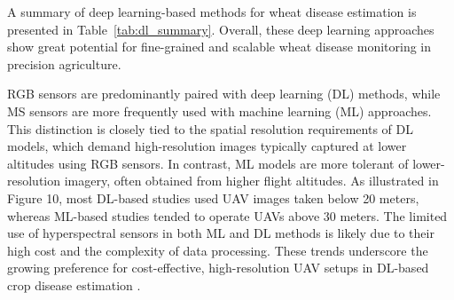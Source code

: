 A summary of deep learning-based methods for wheat disease estimation is presented in Table~\ref{tab:dl_summary}. Overall, these deep learning approaches show great potential for fine-grained and scalable wheat disease monitoring in precision agriculture.

\begin{table}[h]
    \centering
    \caption{Summary of deep learning-based methods for wheat disease estimation.}
    \label{tab:dl_summary}
    \end{table}
    









RGB sensors are predominantly paired with deep learning (DL) methods, while MS sensors are more frequently used with machine learning (ML) approaches. This distinction is closely tied to the spatial resolution requirements of DL models, which demand high-resolution images typically captured at lower altitudes using RGB sensors. In contrast, ML models are more tolerant of lower-resolution imagery, often obtained from higher flight altitudes. As illustrated in Figure 10, most DL-based studies used UAV images taken below 20 meters, whereas ML-based studies tended to operate UAVs above 30 meters. The limited use of hyperspectral sensors in both ML and DL methods is likely due to their high cost and the complexity of data processing. These trends underscore the growing preference for cost-effective, high-resolution UAV setups in DL-based crop disease estimation \parencite{shahi2023recent}.



